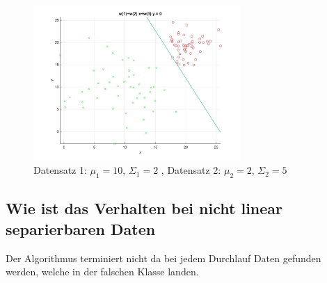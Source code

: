 \documentclass[]{report}
\begin{document}
\begin{figure}[p]
\includegraphics[width=0.7\textwidth]{./images/MyPerceptron_4.jpg}
\caption{Datensatz 1: $\mu_1=10$, $\Sigma_1=2$ , Datensatz 2: $\mu_2=2$, $\Sigma_2=5$}
\end{figure}


\subsection{Wie ist das Verhalten bei nicht linear separierbaren Daten}

Der Algorithmus terminiert nicht da bei jedem Durchlauf Daten gefunden werden, welche in der falschen Klasse landen.
\end{document}
